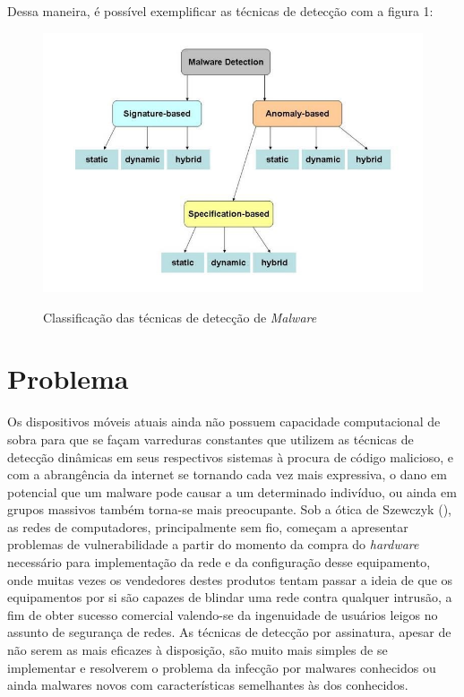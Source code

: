 Dessa maneira, é possível exemplificar as técnicas de detecção com a figura 1:

\begin{figure}[H]
\caption{\small Classificação das técnicas de detecção de \textit{Malware}}
\centering
\includegraphics[scale=0.8]{figs/fig1}
\label{f.metodos_deteccao_01}
\end{figure}

\chapter{Problema}
\label{c.problema}

Os dispositivos móveis atuais ainda não possuem capacidade computacional de
sobra para que se façam varreduras constantes que utilizem as técnicas de
detecção dinâmicas em seus respectivos sistemas à procura de código malicioso,
e com a abrangência da internet se tornando cada vez mais expressiva, o dano
em potencial que um malware pode causar a um determinado indivíduo, ou ainda
em grupos massivos também torna-se mais preocupante. Sob a ótica de Szewczyk
(\citeyear{szewczyk12}), as redes de computadores, principalmente sem fio, começam a apresentar
problemas de vulnerabilidade a partir do momento da compra do \textit{hardware}
necessário para implementação da rede e da configuração desse equipamento,
onde muitas vezes os vendedores destes produtos tentam passar a ideia de que
os equipamentos por si são capazes de blindar uma rede contra qualquer
intrusão, a fim de obter sucesso comercial valendo-se da ingenuidade de
usuários leigos no assunto de segurança de redes. As técnicas de detecção por
assinatura, apesar de não serem as mais eficazes à disposição, são muito mais
simples de se implementar e resolverem o problema da infecção por malwares
conhecidos ou ainda malwares novos com características semelhantes às dos
conhecidos.




